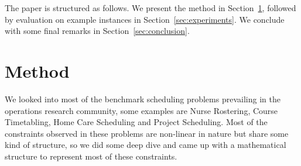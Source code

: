 \documentclass{article}
\begin{document}
The paper is structured as follows. We present the method in Section~\ref{sec:method}, followed by evaluation on example instances  in Section~\ref{sec:experiments}. We conclude with some final remarks in Section~\ref{sec:conclusion}.


\section{Method}
\label{sec:method}

We looked into most of the benchmark scheduling problems prevailing in the operations research community, some examples are Nurse Rostering, Course Timetabling, Home Care Scheduling and Project Scheduling. Most of the constraints observed in these problems are non-linear in nature but share some kind of structure, so we did some deep dive and came up with a mathematical structure to represent most of these constraints. 
\end{document}
